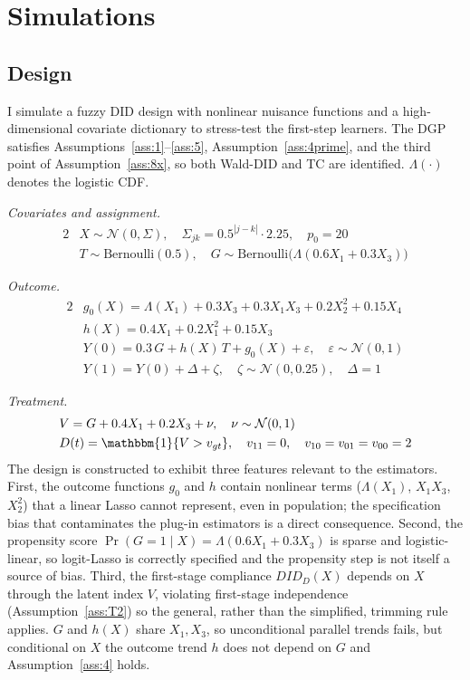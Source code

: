\section{Simulations}\label{sec:5}

\subsection{Design}\label{sec:5a}

I simulate a fuzzy DID design with nonlinear nuisance functions and a high-dimensional covariate dictionary to stress-test the first-step learners. The DGP satisfies Assumptions~\ref{ass:1}--\ref{ass:5}, Assumption~\ref{ass:4prime}, and the third point of Assumption~\ref{ass:8x}, so both Wald-DID and TC are identified. $\Lambda(\cdot)$ denotes the logistic CDF.

\medskip
\noindent\textit{Covariates and assignment.}
\begin{alignat*}{2}
    & X \sim \mathcal{N}(0,\Sigma), \quad \Sigma_{jk} = 0.5^{|j-k|} \cdot 2.25, \quad p_0 = 20 \\
    & T \sim \text{Bernoulli}(0.5), \quad G \sim \text{Bernoulli}\big(\Lambda(0.6 X_1 + 0.3 X_3)\big)
\end{alignat*}

\noindent\textit{Outcome.}
\begin{alignat*}{2}
    & g_0(X) = \Lambda(X_1) + 0.3 X_3 + 0.3 X_1 X_3 + 0.2 X_2^2 + 0.15 X_4 \\
    & h(X) = 0.4 X_1 + 0.2 X_1^2 + 0.15 X_3 \\
    & Y(0) = 0.3\, G + h(X)\, T + g_0(X) + \varepsilon, \quad \varepsilon \sim \mathcal{N}(0,1) \\
    & Y(1) = Y(0) + \Delta + \zeta, \quad \zeta \sim \mathcal{N}(0, 0.25), \quad \Delta = 1
\end{alignat*}

\noindent\textit{Treatment.}
\begin{alignat*}{2}
    & V = G + 0.4 X_1 + 0.2 X_3 + \nu, \quad \nu \sim \mathcal{N}(0,1) \\
    & D(t) = \mathbbm{1}\{V > v_{gt}\}, \quad v_{11} = 0, \quad v_{10} = v_{01} = v_{00} = 2
\end{alignat*}
The design is constructed to exhibit three features relevant to the estimators. First, the outcome functions $g_0$ and $h$ contain nonlinear terms ($\Lambda(X_1)$, $X_1 X_3$, $X_2^2$) that a linear Lasso cannot represent, even in population; the specification bias that contaminates the plug-in estimators is a direct consequence. Second, the propensity score $\Pr(G=1\mid X) = \Lambda(0.6 X_1 + 0.3 X_3)$ is sparse and logistic-linear, so logit-Lasso is correctly specified and the propensity step is not itself a source of bias. Third, the first-stage compliance $DID_D(X)$ depends on $X$ through the latent index $V$, violating first-stage independence (Assumption~\ref{ass:T2}) so the general, rather than the simplified, trimming rule applies. $G$ and $h(X)$ share $X_1, X_3$, so unconditional parallel trends fails, but conditional on $X$ the outcome trend $h$ does not depend on $G$ and Assumption~\ref{ass:4} holds.

